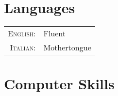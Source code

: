 \documentclass[a4paper,10pt]{article} %
\begin{document}





\section{Languages}

\begin{tabular}{rl}
\textsc{English:} & Fluent \\%

\textsc{Italian:} & Mothertongue\\
\end{tabular}


\section{Computer Skills}
\end{document}
